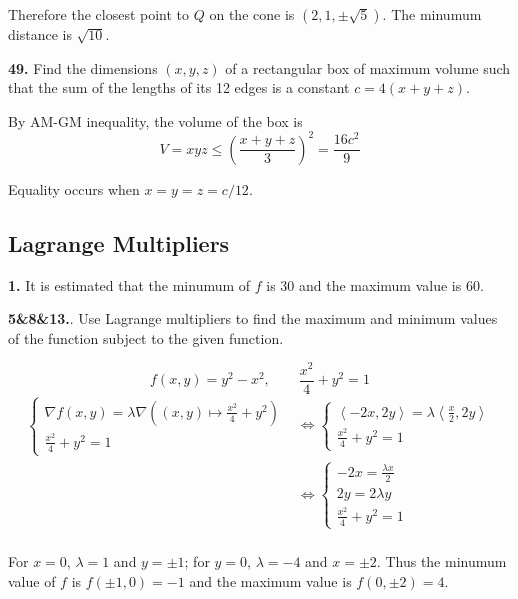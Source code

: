 \documentclass[a4paper,12pt]{article}
\newcommand{\exercise}[1]{\noindent\textbf{#1.}}
\begin{document}
Therefore the closest point to $Q$ on the cone is $\left(2, 1, \pm\sqrt 5\right)$.
The minumum distance is $\sqrt{10}$.

\exercise{49} Find the dimensions $(x, y, z)$ of a rectangular box of
maximum volume such that the sum of the lengths of its 12 edges is a constant
$c = 4(x + y + z)$.

By AM-GM inequality, the volume of the box is
\[V = xyz \leq \left(\frac{x + y + z}{3}\right)^2 = \frac{16c^2}{9}\]

Equality occurs when $x = y = z = c/12$.

\subsection{Lagrange Multipliers}
\exercise{1} It is estimated that the minumum of $f$ is 30
and the maximum value is 60.

\exercise{5\&8\&13}. Use Lagrange multipliers to find the maximum and minimum
values of the function subject to the given function.

\[f(x, y) = y^2 - x^2,\qquad \frac{x^2}{4} + y^2 = 1\tag{5}\]
\begin{align*}
  \begin{cases}
    \nabla f(x, y) = \lambda\nabla((x, y) \mapsto \frac{x^2}{4} + y^2)\\
    \frac{x^2}{4} + y^2 = 1
  \end{cases}
  &\iff
  \begin{cases}
    \left<-2x, 2y\right> = \lambda\left<\frac{x}{2}, 2y\right>\\
    \frac{x^2}{4} + y^2 = 1
  \end{cases}\\
  &\iff
  \begin{cases}
    -2x = \frac{\lambda x}{2}\\
    2y = 2\lambda y\\
    \frac{x^2}{4} + y^2 = 1
  \end{cases}\\
\end{align*}

For $x = 0$, $\lambda = 1$ and $y = \pm 1$; for $y = 0$, $\lambda = -4$
and $x = \pm 2$. Thus the minumum value of $f$ is $f(\pm 1, 0) = -1$
and the maximum value is $f(0, \pm 2) = 4$.
\end{document}
